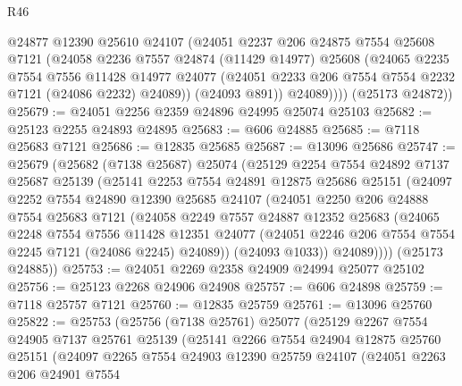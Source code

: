 \begin{lexlean}{R46}
\begin{coremodule}
            @24877
            @12390
            @25610
            @24107
            (@24051
              @2237
              @206
              @24875
              @7554
              @25608
              @7121
              (@24058
                @2236
                @7557
                @24874
                (@11429 @14977)
                @25608
                (@24065
                  @2235
                  @7554
                  @7556
                  @11428
                  @14977
                  @24077
                  (@24051 @2233 @206 @7554 @7554 @2232 @7121 (@24086 @2232) @24089))
                (@24093 @891))
              @24089))))
      (@25173 @24872))
@25679 := @24051 @2256 @2359 @24896 @24995 @25074 @25103
@25682 := @25123 @2255 @24893 @24895
@25683 := @606 @24885
@25685 := @7118 @25683 @7121
@25686 := @12835 @25685
@25687 := @13096 @25686
@25747 := @25679
    (@25682
      (@7138 @25687)
      @25074
      (@25129
        @2254
        @7554
        @24892
        @7137
        @25687
        @25139
        (@25141
          @2253
          @7554
          @24891
          @12875
          @25686
          @25151
          (@24097
            @2252
            @7554
            @24890
            @12390
            @25685
            @24107
            (@24051
              @2250
              @206
              @24888
              @7554
              @25683
              @7121
              (@24058
                @2249
                @7557
                @24887
                @12352
                @25683
                (@24065
                  @2248
                  @7554
                  @7556
                  @11428
                  @12351
                  @24077
                  (@24051 @2246 @206 @7554 @7554 @2245 @7121 (@24086 @2245) @24089))
                (@24093 @1033))
              @24089))))
      (@25173 @24885))
@25753 := @24051 @2269 @2358 @24909 @24994 @25077 @25102
@25756 := @25123 @2268 @24906 @24908
@25757 := @606 @24898
@25759 := @7118 @25757 @7121
@25760 := @12835 @25759
@25761 := @13096 @25760
@25822 := @25753
    (@25756
      (@7138 @25761)
      @25077
      (@25129
        @2267
        @7554
        @24905
        @7137
        @25761
        @25139
        (@25141
          @2266
          @7554
          @24904
          @12875
          @25760
          @25151
          (@24097
            @2265
            @7554
            @24903
            @12390
            @25759
            @24107
            (@24051
              @2263
              @206
              @24901
              @7554

\end{coremodule}
\end{lexlean}
